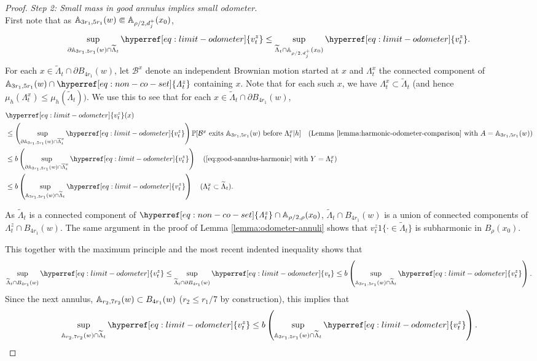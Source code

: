 \documentclass[12pt]{amsart}
\numberwithin{equation}{section}
\newcommand{\cluster}[2]{\hyperref[eq:non-co-set]{\mathit{\Lambda}^{#1}_{#2}}}
\newcommand{\odometer}[2]{\hyperref[eq:limit-odometer]{v^{#1}_{#2}}}
\begin{document}
\begin{proof}
		{\it Step 2: Small mass in good annulus implies small odometer.} \\
		First note that as $\mathbb{A}_{3 r_1, 5 r_1}(w) \Subset \mathbb{A}_{\rho/2, d^+_j}(x_0)$, 
		\begin{equation} \label{eq:outer-odom-sup}
		\sup_{\partial \A_{3 r_1, 5 r_1}(w) \cap \widetilde \Lambda_t} \odometer{z}{t} \leq \sup_{\widetilde \Lambda_t \cap \A_{\rho/2, d^+_j}(x_0)} \odometer{z}{t}.
		\end{equation}
		For each $x \in \widetilde \Lambda_t \cap \partial B_{4 r_1}(w)$, let $\mathcal{B}^x$ denote an independent Brownian motion started at $x$ and $\Lambda^x_t$ 
		the connected component of $\A_{3r_1, 5r_1}(w) \cap {\cluster{z}{t}}$ containing $x$. 
		Note that for each such $x$, we have $\Lambda_t^x \subset \widetilde \Lambda_t$ (and hence $\mu_h(\Lambda_t^x) \leq \mu_h(\tilde \Lambda_t))$.
		We use this to see that for each $x \in \widetilde \Lambda_t \cap \partial B_{4 r_1}(w)$, 
		\begin{align*}
		&\odometer{z}{t}(x) \\
		&\leq \left( \sup_{\partial \A_{3r_1, 5r_1}(w) \cap \overline \Lambda^x_t} \odometer{z}{t} \right)  \P[\mbox{$\mathcal{B}^x$ exits  $\A_{3r_1 , 5r_1}(w)$ before  $\Lambda^x_t$} | h]
		\quad \mbox{(Lemma \ref{lemma:harmonic-odometer-comparison} with $A = \A_{3r_1, 5r_1}(w)$)} \\
		&\leq b \left( \sup_{\partial \A_{3r_1, 5r_1}(w) \cap \overline \Lambda^x_t} \odometer{z}{t} \right)  \quad \mbox{(\eqref{eq:good-annulus-harmonic} with $Y = \Lambda^x_t$)} \\
		&\leq b  \left( \sup_{  \A_{3 r_1, 5 r_1}(w) \cap  \widetilde \Lambda_t}   \odometer{z}{t} \right) \quad \mbox{($\Lambda_t^x \subset \widetilde \Lambda_t$)}.
		\end{align*}
		
		
		As $\widetilde \Lambda_t$ is a connected component 
		of ${\cluster{z}{t}} \cap \A_{\rho/2, \rho}(x_0)$,  $\widetilde \Lambda_t \cap B_{4 r_1}(w)$ is a union 
		of connected components of ${\cluster{z}{t}} \cap B_{4 r_1}(w)$. 
		The same argument in the proof of Lemma \ref{lemma:odometer-annuli} shows that $\odometer{z}{t} 1\{ \cdot \in \widetilde \Lambda_t\}$
		is subharmonic in $B_{\rho}(x_0)$. 
		
		This together with the maximum principle and the most recent indented inequality shows that
		\[
		\sup_{\widetilde \Lambda_t \cap B_{4 r_1}(w)} \odometer{z}{t} \leq 	\sup_{\widetilde \Lambda_t \cap \partial B_{4 r_1}(w)} \odometer{}{t} \leq  b \left( \sup_{ \A_{3 r_1, 5 r_1}(w) \cap \widetilde \Lambda_t} \odometer{z}{t} \right).
		\]
		Since the next annulus, $\mathbb{A}_{r_2, 7 r_2}(w) \subset B_{4 r_1}(w)$ ($r_2 \leq r_1/7$ by construction), this implies that 
		\[
		\sup_{  \A_{r_2, 7 r_2}(w) \cap \widetilde \Lambda_t } \odometer{z}{t} \leq  b  \left( \sup_{  \A_{3 r_1, 5 r_1}(w) \cap \widetilde \Lambda_t} \odometer{z}{t} \right) .
		\]
		

\end{proof}
\end{document}
